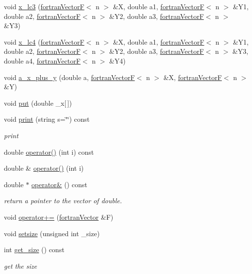 \begin{DoxyCompactItemize}
\item 
void \hyperlink{classodes_1_1fortranVectorF_a643042c3db0e9be3a95a8f516d080fd4}{x\-\_\-lc3} (\hyperlink{classodes_1_1fortranVectorF}{fortran\-Vector\-F}$<$ n $>$ \&X, double a1, \hyperlink{classodes_1_1fortranVectorF}{fortran\-Vector\-F}$<$ n $>$ \&Y1, double a2, \hyperlink{classodes_1_1fortranVectorF}{fortran\-Vector\-F}$<$ n $>$ \&Y2, double a3, \hyperlink{classodes_1_1fortranVectorF}{fortran\-Vector\-F}$<$ n $>$ \&Y3)
\item 
void \hyperlink{classodes_1_1fortranVectorF_acb167044e5f56a0f7f98b6fe6746be62}{x\-\_\-lc4} (\hyperlink{classodes_1_1fortranVectorF}{fortran\-Vector\-F}$<$ n $>$ \&X, double a1, \hyperlink{classodes_1_1fortranVectorF}{fortran\-Vector\-F}$<$ n $>$ \&Y1, double a2, \hyperlink{classodes_1_1fortranVectorF}{fortran\-Vector\-F}$<$ n $>$ \&Y2, double a3, \hyperlink{classodes_1_1fortranVectorF}{fortran\-Vector\-F}$<$ n $>$ \&Y3, double a4, \hyperlink{classodes_1_1fortranVectorF}{fortran\-Vector\-F}$<$ n $>$ \&Y4)
\item 
void \hyperlink{classodes_1_1fortranVectorF_a21b1998c692b54b7dc08ad20bf34ffcd}{a\-\_\-x\-\_\-plus\-\_\-y} (double a, \hyperlink{classodes_1_1fortranVectorF}{fortran\-Vector\-F}$<$ n $>$ \&X, \hyperlink{classodes_1_1fortranVectorF}{fortran\-Vector\-F}$<$ n $>$ \&Y)
\item 
void \hyperlink{classodes_1_1fortranVectorF_aa2df927f58d5d1109a16e677ac288b66}{put} (double \-\_\-x\mbox{[}$\,$\mbox{]})
\item 
void \hyperlink{classodes_1_1fortranVectorF_aac928c0ef38e1b6226b621ff60ff092d}{print} (string s=\char`\"{}\char`\"{}) const 
\begin{DoxyCompactList}\small\item\em print \end{DoxyCompactList}\item 
double \hyperlink{classodes_1_1fortranVector_acd2f3c622c5c901e0a2fcefc445fb74c}{operator()} (int i) const 
\item 
double \& \hyperlink{classodes_1_1fortranVector_a9177196a3ec94139a163e7fa8b19b92b}{operator()} (int i)
\item 
double $\ast$ \hyperlink{classodes_1_1fortranVector_ada6f1dfa695ada960f621d9728e0f8e0}{operator\&} () const 
\begin{DoxyCompactList}\small\item\em return a pointer to the vector of double. \end{DoxyCompactList}\item 
void \hyperlink{classodes_1_1fortranVector_ae522acf0f26411ce0ee14c77cddd7bfa}{operator+=} (\hyperlink{classodes_1_1fortranVector}{fortran\-Vector} \&F)
\item 
void \hyperlink{classodes_1_1fortranVector_a7f11009e278203c327c93d68e86117c9}{setsize} (unsigned int \-\_\-size)
\item 
int \hyperlink{classodes_1_1fortranVector_a0a9a82f6efc0a9e5ea40dc240eebc800}{get\-\_\-size} () const 
\begin{DoxyCompactList}\small\item\em get the size \end{DoxyCompactList}\end{DoxyCompactItemize}
